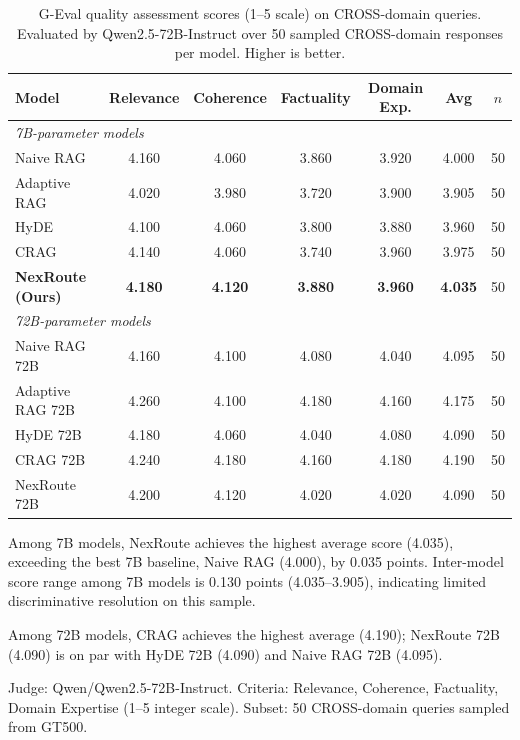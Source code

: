 \begin{table}[h]
\centering
\caption{G-Eval quality assessment scores (1--5 scale) on CROSS-domain queries.
  Evaluated by Qwen2.5-72B-Instruct over 50 sampled CROSS-domain responses
  per model. Higher is better.}
\label{tab:geval_preliminary}
\setlength{\tabcolsep}{7pt}
\begin{tabular}{lcccccc}
\toprule
\textbf{Model}
  & \textbf{Relevance}
  & \textbf{Coherence}
  & \textbf{Factuality}
  & \textbf{Domain Exp.}
  & \textbf{Avg}
  & $n$ \\
\midrule
\multicolumn{7}{l}{\textit{7B-parameter models}} \\
Naive RAG         & 4.160 & 4.060 & 3.860 & 3.920 & 4.000 & 50 \\
Adaptive RAG      & 4.020 & 3.980 & 3.720 & 3.900 & 3.905 & 50 \\
HyDE              & 4.100 & 4.060 & 3.800 & 3.880 & 3.960 & 50 \\
CRAG              & 4.140 & 4.060 & 3.740 & 3.960 & 3.975 & 50 \\
\textbf{NexRoute (Ours)} & \textbf{4.180} & \textbf{4.120} & \textbf{3.880} & \textbf{3.960} & \textbf{4.035} & 50 \\
\midrule
\multicolumn{7}{l}{\textit{72B-parameter models}} \\
Naive RAG 72B     & 4.160 & 4.100 & 4.080 & 4.040 & 4.095 & 50 \\
Adaptive RAG 72B  & 4.260 & 4.100 & 4.180 & 4.160 & 4.175 & 50 \\
HyDE 72B          & 4.180 & 4.060 & 4.040 & 4.080 & 4.090 & 50 \\
CRAG 72B          & 4.240 & 4.180 & 4.160 & 4.180 & 4.190 & 50 \\
NexRoute 72B      & 4.200 & 4.120 & 4.020 & 4.020 & 4.090 & 50 \\
\bottomrule
\end{tabular}
\begin{tablenotes}[flushleft]\footnotesize
  \item Among 7B models, NexRoute achieves the highest average score (4.035),
    exceeding the best 7B baseline, Naive RAG (4.000), by 0.035 points.
    Inter-model score range among 7B models is 0.130 points (4.035--3.905),
    indicating limited discriminative resolution on this sample.
  \item Among 72B models, CRAG achieves the highest average (4.190); NexRoute
    72B (4.090) is on par with HyDE 72B (4.090) and Naive RAG 72B (4.095).
  \item Judge: Qwen/Qwen2.5-72B-Instruct. Criteria: Relevance, Coherence,
    Factuality, Domain Expertise (1--5 integer scale). Subset: 50 CROSS-domain
    queries sampled from GT500.
\end{tablenotes}
\end{table}
